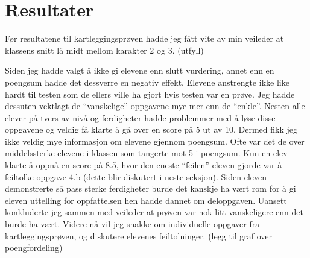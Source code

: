 \documentclass[main.tex]{subfiles}
\begin{document}
\section*{Resultater}
\label{sec:4}

Før resultatene til kartleggingsprøven hadde jeg fått vite av min veileder at klassens snitt lå midt mellom
karakter 2 og 3. (utfyll)

Siden jeg hadde valgt å ikke gi elevene enn slutt vurdering, annet enn en poengsum hadde det dessverre en negativ effekt. Elevene anstrengte ikke like hardt til testen som de ellers ville ha gjort hvis testen var en prøve.
 Jeg hadde dessuten vektlagt de ``vanskelige'' oppgavene mye mer enn de 
``enkle''. Nesten alle elever på tvers av nivå og ferdigheter hadde 
problemmer med å løse disse oppgavene og veldig få klarte å gå over en score på 5 ut av 10. Dermed fikk jeg ikke 
veldig mye informasjon om elevene gjennom poengsum. Ofte var det de over middelssterke elevene i klassen som tangerte
mot 5 i poengsum. Kun en elev klarte å oppnå en score på 8.5, hvor den eneste ``feilen'' eleven gjorde var å
feiltolke oppgave 4.b (dette blir diskutert i neste seksjon). Siden eleven demonstrerte så pass sterke ferdigheter 
burde det kanskje ha vært rom for å gi eleven uttelling for oppfattelsen hen hadde dannet om deloppgaven. 
Uansett konkluderte jeg sammen med veileder at prøven var nok litt vanskeligere enn det burde ha vært. Videre nå vil 
jeg snakke om individuelle oppgaver fra kartleggingsprøven, og diskutere elevenes feiltolninger.
(legg til graf over poengfordeling)
\end{document}
